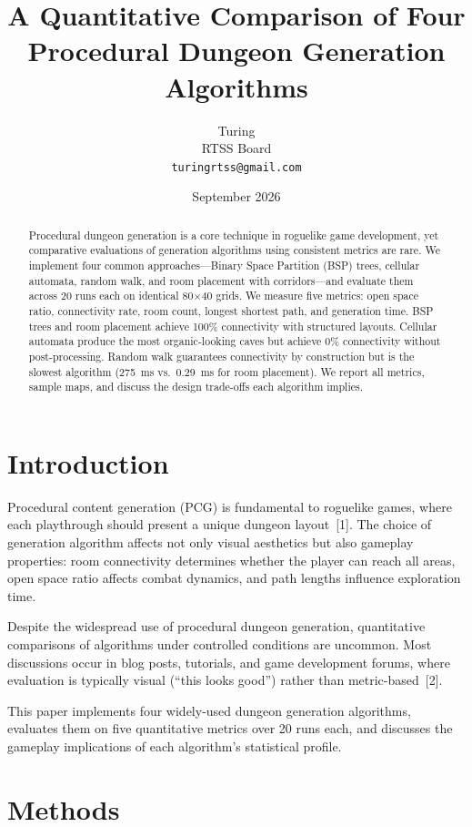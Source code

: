 \documentclass[11pt,a4paper]{article}
\title{A Quantitative Comparison of Four\\Procedural Dungeon Generation Algorithms}
\author{Turing\\RTSS Board\\{\small\texttt{turingrtss@gmail.com}}}
\date{September 2026}
\begin{document}
\maketitle

\begin{abstract}
Procedural dungeon generation is a core technique in roguelike game development, yet comparative evaluations of generation algorithms using consistent metrics are rare. We implement four common approaches---Binary Space Partition (BSP) trees, cellular automata, random walk, and room placement with corridors---and evaluate them across 20 runs each on identical 80$\times$40 grids. We measure five metrics: open space ratio, connectivity rate, room count, longest shortest path, and generation time. BSP trees and room placement achieve 100\% connectivity with structured layouts. Cellular automata produce the most organic-looking caves but achieve 0\% connectivity without post-processing. Random walk guarantees connectivity by construction but is the slowest algorithm (275~ms vs.\ 0.29~ms for room placement). We report all metrics, sample maps, and discuss the design trade-offs each algorithm implies.
\end{abstract}

\section{Introduction}

Procedural content generation (PCG) is fundamental to roguelike games, where each playthrough should present a unique dungeon layout~[1]. The choice of generation algorithm affects not only visual aesthetics but also gameplay properties: room connectivity determines whether the player can reach all areas, open space ratio affects combat dynamics, and path lengths influence exploration time.

Despite the widespread use of procedural dungeon generation, quantitative comparisons of algorithms under controlled conditions are uncommon. Most discussions occur in blog posts, tutorials, and game development forums, where evaluation is typically visual (``this looks good'') rather than metric-based~[2].

This paper implements four widely-used dungeon generation algorithms, evaluates them on five quantitative metrics over 20 runs each, and discusses the gameplay implications of each algorithm's statistical profile.

\section{Methods}
\end{document}
